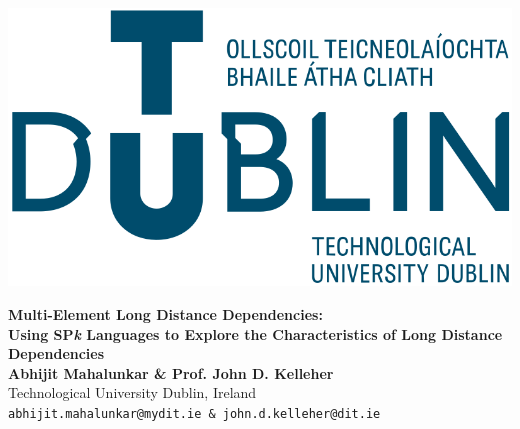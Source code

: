 \documentclass[a0,portrait]{a0poster}
\begin{document}
\begin{minipage}[c]{0.25\linewidth}
\includegraphics[width=16.5cm]{logo.png}\\
\end{minipage}
\begin{minipage}[c]{0.75\linewidth}
\veryHuge \color{tudLogoColor} \textbf{Multi-Element Long Distance Dependencies:}\\ %
\Huge\textbf{Using SP\emph{k} Languages to Explore the Characteristics of Long Distance Dependencies} \color{Black}\\[1cm] %
\huge{}\textbf{Abhijit Mahalunkar \& Prof. John D. Kelleher}\\[0.5cm]
\huge Technological University Dublin, Ireland\\[0.4cm]
\Large \texttt{abhijit.mahalunkar@mydit.ie \& john.d.kelleher@dit.ie}\\
\end{minipage}


\end{document}
